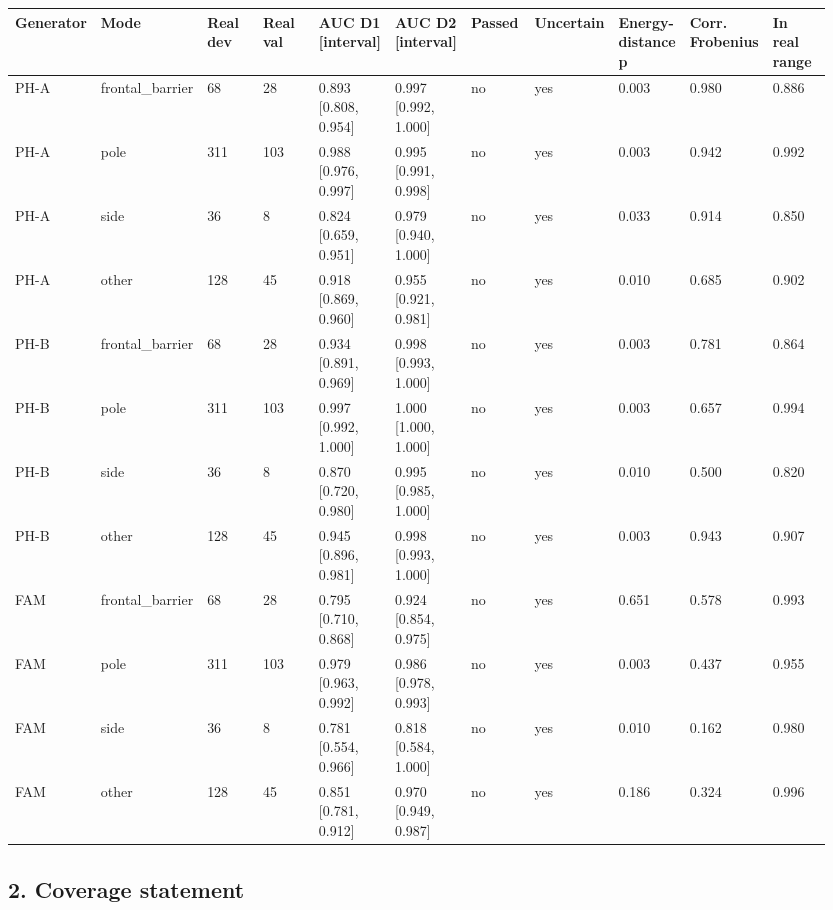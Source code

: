 {\scriptsize\raggedright
\begin{longtable}{p{0.086\linewidth}p{0.086\linewidth}p{0.086\linewidth}p{0.086\linewidth}p{0.086\linewidth}p{0.086\linewidth}p{0.086\linewidth}p{0.086\linewidth}p{0.086\linewidth}p{0.086\linewidth}p{0.086\linewidth}}
\toprule
Generator & Mode & Real dev & Real val & AUC D1 [interval] & AUC D2 [interval] & Passed & Uncertain & Energy-distance p & Corr. Frobenius & In real range \\
\midrule
\endhead
PH-A & frontal\_barrier & 68 & 28 & 0.893 [0.808, 0.954] & 0.997 [0.992, 1.000] & no & yes & 0.003 & 0.980 & 0.886 \\
PH-A & pole & 311 & 103 & 0.988 [0.976, 0.997] & 0.995 [0.991, 0.998] & no & yes & 0.003 & 0.942 & 0.992 \\
PH-A & side & 36 & 8 & 0.824 [0.659, 0.951] & 0.979 [0.940, 1.000] & no & yes & 0.033 & 0.914 & 0.850 \\
PH-A & other & 128 & 45 & 0.918 [0.869, 0.960] & 0.955 [0.921, 0.981] & no & yes & 0.010 & 0.685 & 0.902 \\
PH-B & frontal\_barrier & 68 & 28 & 0.934 [0.891, 0.969] & 0.998 [0.993, 1.000] & no & yes & 0.003 & 0.781 & 0.864 \\
PH-B & pole & 311 & 103 & 0.997 [0.992, 1.000] & 1.000 [1.000, 1.000] & no & yes & 0.003 & 0.657 & 0.994 \\
PH-B & side & 36 & 8 & 0.870 [0.720, 0.980] & 0.995 [0.985, 1.000] & no & yes & 0.010 & 0.500 & 0.820 \\
PH-B & other & 128 & 45 & 0.945 [0.896, 0.981] & 0.998 [0.993, 1.000] & no & yes & 0.003 & 0.943 & 0.907 \\
FAM & frontal\_barrier & 68 & 28 & 0.795 [0.710, 0.868] & 0.924 [0.854, 0.975] & no & yes & 0.651 & 0.578 & 0.993 \\
FAM & pole & 311 & 103 & 0.979 [0.963, 0.992] & 0.986 [0.978, 0.993] & no & yes & 0.003 & 0.437 & 0.955 \\
FAM & side & 36 & 8 & 0.781 [0.554, 0.966] & 0.818 [0.584, 1.000] & no & yes & 0.010 & 0.162 & 0.980 \\
FAM & other & 128 & 45 & 0.851 [0.781, 0.912] & 0.970 [0.949, 0.987] & no & yes & 0.186 & 0.324 & 0.996 \\
\bottomrule
\end{longtable}}

\subsection*{2. Coverage statement}

